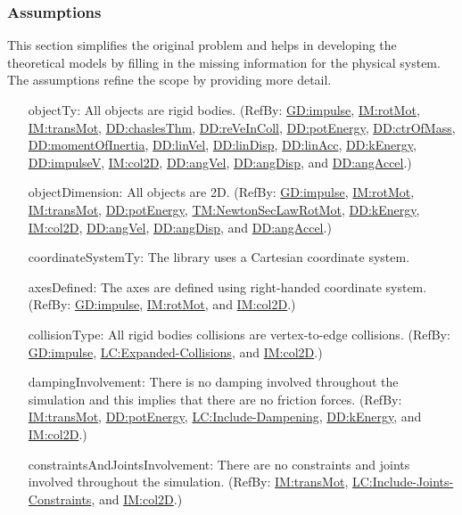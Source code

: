 \documentclass[12pt]{article}
\begin{document}
\subsubsection{Assumptions}
\label{Sec:Assumps}
This section simplifies the original problem and helps in developing the theoretical models by filling in the missing information for the physical system. The assumptions refine the scope by providing more detail.

\begin{itemize}
\item[objectTy:\phantomsection\label{assumpOT}]{All objects are rigid bodies. (RefBy: \hyperref[GD:impulse]{GD:impulse}, \hyperref[IM:rotMot]{IM:rotMot}, \hyperref[IM:transMot]{IM:transMot}, \hyperref[DD:chaslesThm]{DD:chaslesThm}, \hyperref[DD:reVeInColl]{DD:reVeInColl}, \hyperref[DD:potEnergy]{DD:potEnergy}, \hyperref[DD:ctrOfMass]{DD:ctrOfMass}, \hyperref[DD:momentOfInertia]{DD:momentOfInertia}, \hyperref[DD:linVel]{DD:linVel}, \hyperref[DD:linDisp]{DD:linDisp}, \hyperref[DD:linAcc]{DD:linAcc}, \hyperref[DD:kEnergy]{DD:kEnergy}, \hyperref[DD:impulseV]{DD:impulseV}, \hyperref[IM:col2D]{IM:col2D}, \hyperref[DD:angVel]{DD:angVel}, \hyperref[DD:angDisp]{DD:angDisp}, and \hyperref[DD:angAccel]{DD:angAccel}.)}
\item[objectDimension:\phantomsection\label{assumpOD}]{All objects are 2D. (RefBy: \hyperref[GD:impulse]{GD:impulse}, \hyperref[IM:rotMot]{IM:rotMot}, \hyperref[IM:transMot]{IM:transMot}, \hyperref[DD:potEnergy]{DD:potEnergy}, \hyperref[TM:NewtonSecLawRotMot]{TM:NewtonSecLawRotMot}, \hyperref[DD:kEnergy]{DD:kEnergy}, \hyperref[IM:col2D]{IM:col2D}, \hyperref[DD:angVel]{DD:angVel}, \hyperref[DD:angDisp]{DD:angDisp}, and \hyperref[DD:angAccel]{DD:angAccel}.)}
\item[coordinateSystemTy:\phantomsection\label{assumpCST}]{The library uses a Cartesian coordinate system.}
\item[axesDefined:\phantomsection\label{assumpAD}]{The axes are defined using right-handed coordinate system. (RefBy: \hyperref[GD:impulse]{GD:impulse}, \hyperref[IM:rotMot]{IM:rotMot}, and \hyperref[IM:col2D]{IM:col2D}.)}
\item[collisionType:\phantomsection\label{assumpCT}]{All rigid bodies collisions are vertex-to-edge collisions. (RefBy: \hyperref[GD:impulse]{GD:impulse}, \hyperref[lcEC]{LC:Expanded-Collisions}, and \hyperref[IM:col2D]{IM:col2D}.)}
\item[dampingInvolvement:\phantomsection\label{assumpDI}]{There is no damping involved throughout the simulation and this implies that there are no friction forces. (RefBy: \hyperref[IM:transMot]{IM:transMot}, \hyperref[DD:potEnergy]{DD:potEnergy}, \hyperref[lcID]{LC:Include-Dampening}, \hyperref[DD:kEnergy]{DD:kEnergy}, and \hyperref[IM:col2D]{IM:col2D}.)}
\item[constraintsAndJointsInvolvement:\phantomsection\label{assumpCAJI}]{There are no constraints and joints involved throughout the simulation. (RefBy: \hyperref[IM:transMot]{IM:transMot}, \hyperref[lcIJC]{LC:Include-Joints-Constraints}, and \hyperref[IM:col2D]{IM:col2D}.)}
\end{itemize}
\end{document}
